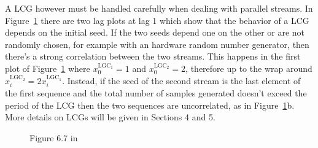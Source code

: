 \documentclass[10pt]{article}
\begin{document}
A LCG however must be handled carefully when dealing with parallel streams. In Figure~\ref{fig:67} there are two lag plots at lag 1 which show that the behavior of a LCG depends on the initial seed. If the two seeds depend one on the other or are not randomly chosen, for example with an hardware random number generator, then there's a strong correlation between the two streams. This happens in the first plot of Figure~\ref{fig:67} where $x_0^{\text{LGC}_1} = 1$ and $x_0^{\text{LGC}_2} = 2$, therefore up to the wrap around $x_i^{\text{LGC}_2} = 2x_i^{\text{LGC}_1}$. Instead, if the seed of the second stream is the last element of the first sequence and the total number of samples generated doesn't exceed the period of the LCG then the two sequences are uncorrelated, as in Figure~\ref{fig:67}b. More details on LCGs will be given in Sections 4 and 5.
\begin{figure}
  \centering
  \caption{Figure 6.7 in \cite{leb}}
  \label{fig:67}
\end{figure}
\end{document}
